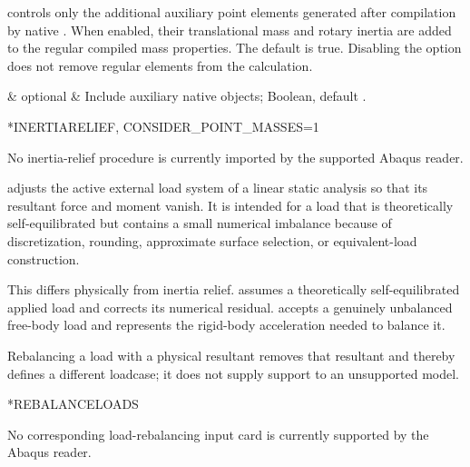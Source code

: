  controls only the additional auxiliary point elements generated after compilation by native . When enabled, their translational mass and rotary inertia are added to the regular compiled mass properties. The default is true. Disabling the option does not remove regular  elements from the calculation.

\begin{keywordparameters}
 & optional & Include auxiliary native  objects; Boolean, default . \\
\end{keywordparameters}

\exampleheading
\begin{dialectexamples}
\begin{femasterdeck}
*INERTIARELIEF, CONSIDER_POINT_MASSES=1
\end{femasterdeck}
\begin{noabaqus}
No inertia-relief procedure is currently imported by the supported Abaqus reader.
\end{noabaqus}
\end{dialectexamples}


 adjusts the active external load system of a linear static analysis so that its resultant force and moment vanish. It is intended for a load that is theoretically self-equilibrated but contains a small numerical imbalance because of discretization, rounding, approximate surface selection, or equivalent-load construction.

This differs physically from inertia relief.  assumes a theoretically self-equilibrated applied load and corrects its numerical residual.  accepts a genuinely unbalanced free-body load and represents the rigid-body acceleration needed to balance it.

Rebalancing a load with a physical resultant removes that resultant and thereby defines a different loadcase; it does not supply support to an unsupported model.

\exampleheading
\begin{dialectexamples}
\begin{femasterdeck}
*REBALANCELOADS
\end{femasterdeck}
\begin{noabaqus}
No corresponding load-rebalancing input card is currently supported by the Abaqus reader.
\end{noabaqus}
\end{dialectexamples}
